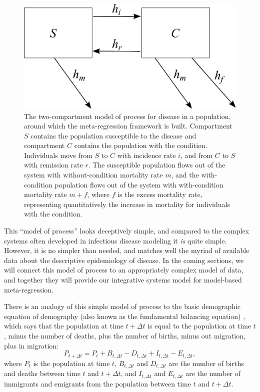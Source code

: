 \begin{figure}[h]
\begin{center}
\includegraphics[width=5in]{SC.pdf}
\caption{The two-compartment model of process for disease in a
  population, around which the meta-regression framework is
  built. Compartment $S$ contains the population susceptible to the
  disease and compartment $C$ contains the population with the
  condition. Individuals move from $S$ to $C$ with incidence rate $i$,
  and from $C$ to $S$ with remission rate $r$. The susceptible
  population flows out of the system with without-condition mortality
  rate $m$, and the with-condition population flows out of the system
  with with-condition mortality rate $m+f$, where $f$ is the excess
  mortality rate, representing quantitatively the increase in
  mortality for individuals with the condition.}
\label{forward-sim-two-compartment}
\end{center}
\end{figure}


This ``model of process'' looks deceptively simple, and compared to
the complex systems often developed in infectious disease modeling it
\emph{is} quite simple.  However, it is no simpler than needed, and
matches well the myriad of available data about the descriptive
epidemiology of disease.  In the coming sections, we will connect this
model of process to an appropriately complex model of data, and
together they will provide our integrative systems model for
model-based meta-regression.

There is an analogy of this simple model of process to the basic
demographic equation of demography (also known as the fundamental
balancing equation) \cite{TK book on demography}, which says that the
population at time $t+\Delta t$ is equal to the population at time
$t$, minus the number of deaths, plus the number of births, minus out
migration, plus in migration:
\[P_{t+\Delta t} = P_t + B_{t, \Delta t} - D_{t, \Delta t} +
 I_{t, \Delta t} - E_{t, \Delta t},
\]
where $P_t$ is the population at time $t$, $B_{t, \Delta t}$ and
$D_{t, \Delta t}$ are the number of births and deaths between time $t$
and $t+\Delta t$, and $I_{t, \Delta t}$ and $E_{t, \Delta t}$ are the
number of immigrants and emigrants from the population between time
$t$ and $t+\Delta t$.

